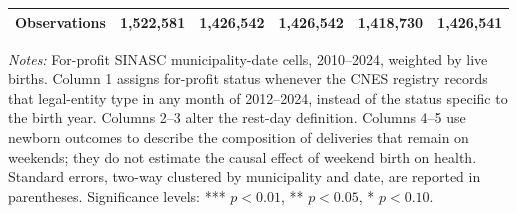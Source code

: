 \begin{table}
{\begin{tabular}{lccccc}
      \midrule
      Observations                  & 1,522,581                             & 1,426,542                  & 1,426,542                & 1,418,730            & 1,426,541\\  
\bottomrule
   \end{tabular}
}
\begin{minipage}{\linewidth}\footnotesize
\textit{Notes:} For-profit SINASC municipality-date cells, 2010--2024, weighted by live births. Column 1 assigns for-profit status whenever the CNES registry records that legal-entity type in any month of 2012--2024, instead of the status specific to the birth year. Columns 2--3 alter the rest-day definition. Columns 4--5 use newborn outcomes to describe the composition of deliveries that remain on weekends; they do not estimate the causal effect of weekend birth on health. Standard errors, two-way clustered by municipality and date, are reported in parentheses.
\newline
\footnotesize Significance levels: *** $p<0.01$, ** $p<0.05$, * $p<0.10$.
\end{minipage}
\end{table}


